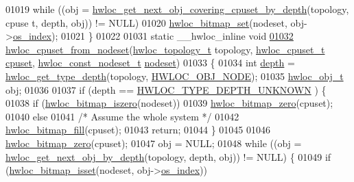 \begin{DoxyCode}
01019         \textcolor{keywordflow}{while} ((obj = \hyperlink{a00056_ga2f9a4ec15e9cfae8c21501257a51ce5b}{hwloc_get_next_obj_covering_cpuset_by_depth}(topology, cpuse
      t, depth, obj)) != NULL)
01020                 \hyperlink{a00065_ga497556af0cc34f109ae0277999c074d3}{hwloc_bitmap_set}(nodeset, obj->\hyperlink{a00016_a61a7a80a68eaccbaaa28269e678c81a9}{os_index});
01021 \}
01022 
01031 \textcolor{keyword}{static} \_\_hwloc\_inline \textcolor{keywordtype}{void}
\hypertarget{a00031_source_l01032}{}\hyperlink{a00062_gaa677fd588304b5615de4ea78104adfb5}{01032} \hyperlink{a00062_gaa677fd588304b5615de4ea78104adfb5}{hwloc_cpuset_from_nodeset}(\hyperlink{a00039_ga9d1e76ee15a7dee158b786c30b6a6e38}{hwloc_topology_t} topology, \hyperlink{a00040_ga4bbf39b68b6f568fb92739e7c0ea7801}{hwloc_cpuset_t} \hyperlink{a00016_a67925e0f2c47f50408fbdb9bddd0790f}{cpuset}, 
      \hyperlink{a00040_ga2f5276235841ad66a79bedad16a5a10c}{hwloc_const_nodeset_t} \hyperlink{a00016_a08f0d0e16c619a6e653526cbee4ffea3}{nodeset})
01033 \{
01034         \textcolor{keywordtype}{int} \hyperlink{a00016_a9d82690370275d42d652eccdea5d3ee5}{depth} = \hyperlink{a00046_gaea7c64dd59467f5201ba87712710b14d}{hwloc_get_type_depth}(topology, \hyperlink{a00041_ggacd37bb612667dc437d66bfb175a8dc55aaf0964881117bdedf1a5e9332cd120dd}{HWLOC_OBJ_NODE});
01035         \hyperlink{a00016}{hwloc_obj_t} obj;
01036 
01037         \textcolor{keywordflow}{if} (depth == \hyperlink{a00046_ggaf4e663cf42bbe20756b849c6293ef575a0565ab92ab72cb0cec91e23003294aad}{HWLOC_TYPE_DEPTH_UNKNOWN} ) \{
01038                 \textcolor{keywordflow}{if} (\hyperlink{a00065_gaa94fed35d2a598bc4a8657b6955b7bf5}{hwloc_bitmap_iszero}(nodeset))
01039                         \hyperlink{a00065_ga6c540b9fe63b8223b6aba46d56dd63b8}{hwloc_bitmap_zero}(cpuset);
01040                 \textcolor{keywordflow}{else}
01041                         \textcolor{comment}{/* Assume the whole system */}
01042                         \hyperlink{a00065_ga52456f7ef79d68e610cb65e3f7ffafad}{hwloc_bitmap_fill}(cpuset);
01043                 \textcolor{keywordflow}{return};
01044         \}
01045 
01046         \hyperlink{a00065_ga6c540b9fe63b8223b6aba46d56dd63b8}{hwloc_bitmap_zero}(cpuset);
01047         obj = NULL;
01048         \textcolor{keywordflow}{while} ((obj = \hyperlink{a00053_gab7c1dce3f42ece5bfa621e87cf332418}{hwloc_get_next_obj_by_depth}(topology, depth, obj)) != NULL)
       \{
01049                 \textcolor{keywordflow}{if} (\hyperlink{a00065_ga2583f44cbdb5fff2ea40efdcf3975d3f}{hwloc_bitmap_isset}(nodeset, obj->\hyperlink{a00016_a61a7a80a68eaccbaaa28269e678c81a9}{os_index}))

\end{DoxyCode}

